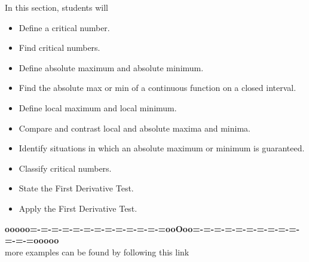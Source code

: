 \documentclass{ximera}
\begin{document}
\begin{sectionOutcomes}
In this section, students will 

\begin{itemize}
\item Define a critical number.
\item Find critical numbers.
\item Define absolute maximum and absolute minimum.
\item Find the absolute max or min of a continuous function on a closed interval.
\item Define local maximum and local minimum.
\item Compare and contrast local and absolute maxima and minima.
\item Identify situations in which an absolute maximum or minimum is guaranteed.
\item Classify critical numbers.
\item State the First Derivative Test.
\item Apply the First Derivative Test.
\end{itemize}
\end{sectionOutcomes}







\begin{center}
\textbf{\textcolor{green!50!black}{ooooo=-=-=-=-=-=-=-=-=-=-=-=-=ooOoo=-=-=-=-=-=-=-=-=-=-=-=-=ooooo}} \\

more examples can be found by following this link\\ 

\end{center}
\end{document}
